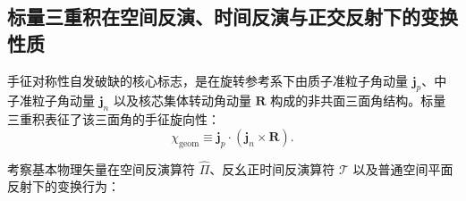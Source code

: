 \subsection{标量三重积在空间反演、时间反演与正交反射下的变换性质}\label{sec:3-7-2}

手征对称性自发破缺的核心标志，是在旋转参考系下由质子准粒子角动量 $\mathbf{j}_p$、中子准粒子角动量 $\mathbf{j}_n$ 以及核芯集体转动角动量 $\mathbf{R}$ 构成的非共面三面角结构。标量三重积表征了该三面角的手征旋向性：
\begin{equation}\label{eq:3-7-triple-product}
\chi_{\text{geom}} \equiv \mathbf{j}_p \cdot (\mathbf{j}_n \times \mathbf{R}).
\end{equation}

考察基本物理矢量在空间反演算符 $\hat{\Pi}$、反幺正时间反演算符 $\mathcal{T}$ 以及普通空间平面反射下的变换行为：
